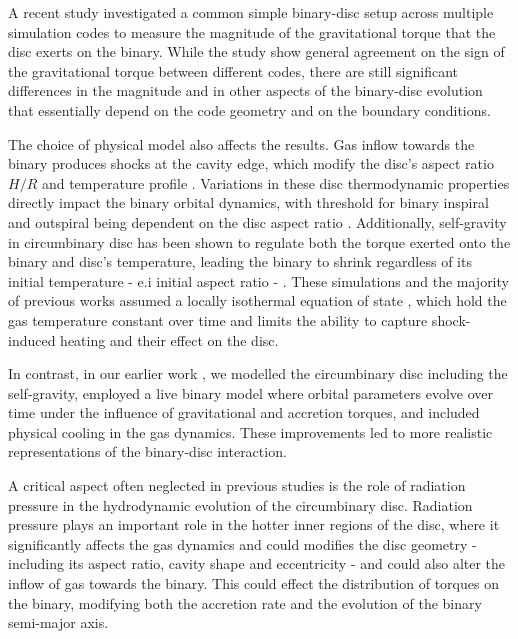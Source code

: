 \documentclass{aa}
\begin{document}
A recent study \citep{SantaBarbara2024} investigated a common simple binary-disc setup across multiple simulation codes to measure the magnitude of the gravitational torque that the disc exerts on the binary.%
While the study show general agreement on the sign of the gravitational torque between different codes, there are still significant differences in the magnitude and in other aspects of the binary-disc evolution that essentially depend on the code geometry and on the boundary conditions.

The choice of physical model also affects the results. Gas inflow towards the binary produces shocks at the cavity edge, which modify the  disc's aspect ratio $H/R$ and temperature profile \citep{artymowicz1996, Hayasaki2007, roedig2011, farris2014, Westernacher2023}. Variations in these disc thermodynamic properties directly impact the binary orbital dynamics, with threshold for binary inspiral and outspiral being dependent on the disc aspect ratio \citep{Tiede2020, HeathNixon2020}.
Additionally, self-gravity in circumbinary disc has been shown to regulate both the torque exerted onto the binary and disc's temperature, leading the binary to shrink regardless of its initial temperature - e.i initial aspect ratio - \citep{Cuadra2009, roedig2012, Franchini2021}. 
These simulations and the majority of previous works assumed a locally isothermal equation of state \citep{Franchini2022, Zrake2021,DOrazio2021}, which hold the gas temperature constant over time and limits the ability to capture shock-induced heating and their effect on the disc. 

In contrast, in our earlier work \citep{Cocchiararo2024}, we modelled the circumbinary disc including the self-gravity, employed a live binary model where orbital parameters evolve over time under the influence of gravitational and accretion torques, and included physical cooling in the gas dynamics. These improvements led to more realistic representations of the binary-disc interaction.

A critical aspect often neglected in previous studies is the role of radiation pressure in the hydrodynamic evolution of the circumbinary disc. Radiation pressure plays an important role in the hotter inner regions of the disc, where it significantly affects the gas dynamics and could modifies the disc geometry - including its aspect ratio, cavity shape and eccentricity - and could also alter the inflow of gas towards the binary. This could effect the distribution of torques on the binary, modifying both the accretion rate and the evolution of the binary semi-major axis. 
\end{document}

